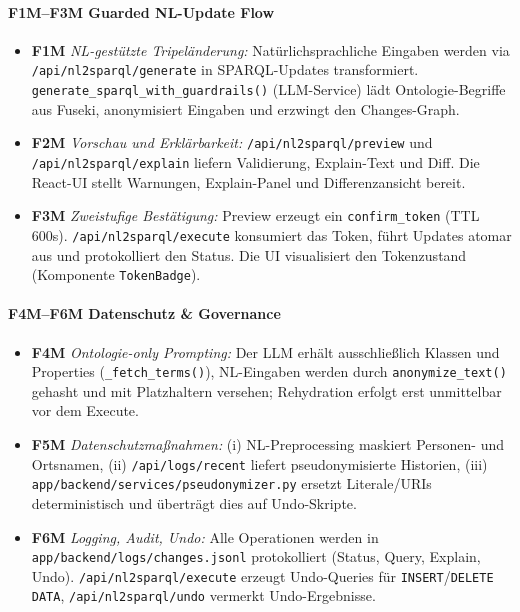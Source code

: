 \paragraph{F1M–F3M Guarded NL-Update Flow}
\begin{itemize}
  \item \textbf{F1M} \emph{NL-gestützte Tripeländerung:} Natürlichsprachliche Eingaben werden via \texttt{/api/nl2sparql/generate} in SPARQL-Updates transformiert. \texttt{generate\_sparql\_with\_guardrails()} (LLM-Service) lädt Ontologie-Begriffe aus Fuseki, anonymisiert Eingaben und erzwingt den Changes-Graph.
  \item \textbf{F2M} \emph{Vorschau und Erklärbarkeit:} \texttt{/api/nl2sparql/preview} und \texttt{/api/nl2sparql/explain} liefern Validierung, Explain-Text und Diff. Die React-UI stellt Warnungen, Explain-Panel und Differenzansicht bereit.
  \item \textbf{F3M} \emph{Zweistufige Bestätigung:} Preview erzeugt ein \texttt{confirm\_token} (TTL 600s). \texttt{/api/nl2sparql/execute} konsumiert das Token, führt Updates atomar aus und protokolliert den Status. Die UI visualisiert den Tokenzustand (Komponente \texttt{TokenBadge}).
\end{itemize}

\paragraph{F4M–F6M Datenschutz \& Governance}
\begin{itemize}
  \item \textbf{F4M} \emph{Ontologie-only Prompting:} Der LLM erhält ausschließlich Klassen und Properties (\texttt{\_fetch\_terms()}), NL-Eingaben werden durch \texttt{anonymize\_text()} gehasht und mit Platzhaltern versehen; Rehydration erfolgt erst unmittelbar vor dem Execute.
  \item \textbf{F5M} \emph{Datenschutzmaßnahmen:} (i) NL-Preprocessing maskiert Personen- und Ortsnamen, (ii) \texttt{/api/logs/recent} liefert pseudonymisierte Historien, (iii) \texttt{app/backend/services/pseudonymizer.py} ersetzt Literale/URIs deterministisch und überträgt dies auf Undo-Skripte.
  \item \textbf{F6M} \emph{Logging, Audit, Undo:} Alle Operationen werden in \texttt{app/backend/logs/changes.jsonl} protokolliert (Status, Query, Explain, Undo). \texttt{/api/nl2sparql/execute} erzeugt Undo-Queries für \texttt{INSERT}/\texttt{DELETE DATA}, \texttt{/api/nl2sparql/undo} vermerkt Undo-Ergebnisse.
\end{itemize}

